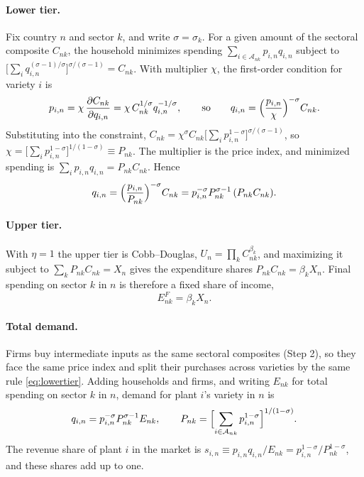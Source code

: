 \documentclass[11pt]{article}
\theoremstyle{remark}
\newcommand{\cA}{\mathcal A}
\begin{document}
\paragraph{Lower tier.} Fix country $n$ and sector $k$, and write $\sigma=\sigma_k$.
For a given amount of the sectoral composite $C_{nk}$, the household minimizes
spending $\sum_{i\in\cA_{nk}}p_{i,n}q_{i,n}$ subject to
$\bigl[\sum_iq_{i,n}^{(\sigma-1)/\sigma}\bigr]^{\sigma/(\sigma-1)}=C_{nk}$. With
multiplier $\chi$, the first-order condition for variety $i$ is
\[
  p_{i,n}=\chi\,\frac{\partial C_{nk}}{\partial q_{i,n}}
  =\chi\,C_{nk}^{1/\sigma}q_{i,n}^{-1/\sigma},
  \qquad\text{so}\qquad
  q_{i,n}=\Bigl(\frac{p_{i,n}}{\chi}\Bigr)^{-\sigma}C_{nk}.
\]
Substituting into the constraint,
$C_{nk}=\chi^{\sigma}C_{nk}\bigl[\sum_ip_{i,n}^{1-\sigma}\bigr]^{\sigma/(\sigma-1)}$,
so $\chi=\bigl[\sum_ip_{i,n}^{1-\sigma}\bigr]^{1/(1-\sigma)}\equiv P_{nk}$. The
multiplier is the price index, and minimized spending is
$\sum_ip_{i,n}q_{i,n}=P_{nk}C_{nk}$. Hence
\begin{equation}
  q_{i,n}=\Bigl(\frac{p_{i,n}}{P_{nk}}\Bigr)^{-\sigma}C_{nk}
  =p_{i,n}^{-\sigma}P_{nk}^{\sigma-1}\,(P_{nk}C_{nk}).
  \label{eq:lowertier}
\end{equation}

\paragraph{Upper tier.} With $\eta=1$ the upper tier is Cobb--Douglas,
$U_n=\prod_kC_{nk}^{\beta_k}$, and maximizing it subject to
$\sum_kP_{nk}C_{nk}=X_n$ gives the expenditure shares $P_{nk}C_{nk}=\beta_kX_n$.
Final spending on sector $k$ in $n$ is therefore a fixed share of income,
\begin{equation}
  E^F_{nk}=\beta_kX_n .
  \label{eq:finalspending}
\end{equation}

\paragraph{Total demand.} Firms buy intermediate inputs as the same sectoral
composites (Step 2), so they face the same price index and split their purchases
across varieties by the same rule \eqref{eq:lowertier}. Adding households and firms,
and writing $E_{nk}$ for total spending on sector $k$ in $n$, demand for plant $i$'s
variety in $n$ is
\begin{equation}
  q_{i,n}=p_{i,n}^{-\sigma}P_{nk}^{\sigma-1}E_{nk},
  \qquad
  P_{nk}=\Bigl[\sum_{i\in\cA_{nk}}p_{i,n}^{1-\sigma}\Bigr]^{1/(1-\sigma)} .
  \label{eq:demand}
\end{equation}
The revenue share of plant $i$ in the market is
$s_{i,n}\equiv p_{i,n}q_{i,n}/E_{nk}=p_{i,n}^{1-\sigma}/P_{nk}^{1-\sigma}$, and these
shares add up to one.
\end{document}
